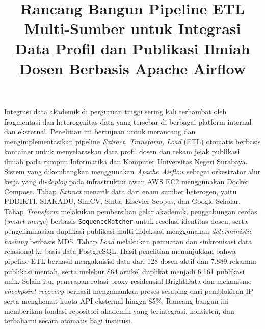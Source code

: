 \documentclass{rapidsart}
\theoremstyle{plain}
\theoremstyle{remark}
\theoremstyle{definition}
\begin{document}
\begin{frontmatter}

    \title{Rancang Bangun Pipeline ETL Multi-Sumber untuk Integrasi Data Profil dan Publikasi Ilmiah Dosen Berbasis Apache Airflow}

    \author{ 
        }

    \author{ }

    \author{ }


    \address{
        ,
    }

    \begin{abstrak}
        Integrasi data akademik di perguruan tinggi sering kali terhambat oleh fragmentasi dan heterogenitas data yang tersebar di berbagai platform internal dan eksternal. Penelitian ini bertujuan untuk merancang dan mengimplementasikan pipeline \textit{Extract, Transform, Load} (ETL) otomatis berbasis kontainer untuk menyelaraskan data profil dosen dan rekam jejak publikasi ilmiah pada rumpun Informatika dan Komputer Universitas Negeri Surabaya. Sistem yang dikembangkan menggunakan \textit{Apache Airflow} sebagai orkestrator alur kerja yang di-\textit{deploy} pada infrastruktur awan AWS EC2 menggunakan Docker Compose. Tahap \textit{Extract} menarik data dari enam sumber heterogen, yaitu PDDIKTI, SIAKADU, SimCV, Sinta, Elsevier Scopus, dan Google Scholar. Tahap \textit{Transform} melakukan pembersihan gelar akademik, penggabungan cerdas (\textit{smart merge}) berbasis \texttt{SequenceMatcher} untuk resolusi identitas dosen, serta pengeliminasian duplikasi publikasi multi-indeksasi menggunakan \textit{deterministic hashing} berbasis MD5. Tahap \textit{Load} melakukan pemuatan dan sinkronisasi data relasional ke basis data PostgreSQL. Hasil penelitian menunjukkan bahwa pipeline ETL berhasil mengakuisisi data dari 128 dosen aktif dan 7.889 rekaman publikasi mentah, serta melebur 864 artikel duplikat menjadi 6.161 publikasi unik. Selain itu, penerapan rotasi proxy residensial BrightData dan mekanisme \textit{checkpoint recovery} berhasil mengamankan proses scraping dari pemblokiran IP serta menghemat kuota API eksternal hingga 85\%. Rancang bangun ini memberikan fondasi repositori akademik yang terintegrasi, konsisten, dan terbaharui secara otomatis bagi institusi.
    \end{abstrak}


\end{frontmatter}
\end{document}
